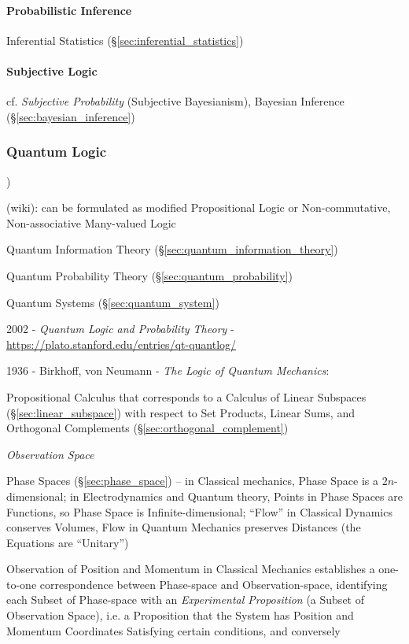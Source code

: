 \paragraph{Probabilistic Inference}\label{sec:probabilistic_inference}\hfill

Inferential Statistics (\S\ref{sec:inferential_statistics})



\paragraph{Subjective Logic}\label{sec:subjective_logic}\hfill

cf. \emph{Subjective Probability} (Subjective Bayesianism), Bayesian Inference
(\S\ref{sec:bayesian_inference})



\subsubsection{Quantum Logic}\label{sec:quantum_logic})

(wiki): can be formulated as modified Propositional Logic or Non-commutative,
Non-associative Many-valued Logic

\fist Quantum Information Theory (\S\ref{sec:quantum_information_theory})

\fist Quantum Probability Theory (\S\ref{sec:quantum_probability})

\fist Quantum Systems (\S\ref{sec:quantum_system})

2002 - \emph{Quantum Logic and Probability Theory} -
\url{https://plato.stanford.edu/entries/qt-quantlog/}

1936 - Birkhoff, von Neumann - \emph{The Logic of Quantum Mechanics}:

Propositional Calculus that corresponds to a Calculus of Linear Subspaces
(\S\ref{sec:linear_subspace}) with respect to Set Products, Linear Sums, and
Orthogonal Complements (\S\ref{sec:orthogonal_complement})

\emph{Observation Space}

Phase Spaces (\S\ref{sec:phase_space}) -- in Classical mechanics, Phase Space is
a $2n$-dimensional; in Electrodynamics and Quantum theory, Points in Phase
Spaces are Functions, so Phase Space is Infinite-dimensional; ``Flow'' in
Classical Dynamics conserves Volumes, Flow in Quantum Mechanics preserves
Distances (the Equations are ``Unitary'')

Observation of Position and Momentum in Classical Mechanics establishes a
one-to-one correspondence between Phase-space and Observation-space, identifying
each Subset of Phase-space with an \emph{Experimental Proposition} (a Subset of
Observation Space), i.e. a Proposition that the System has Position and Momentum
Coordinates Satisfying certain conditions, and conversely

